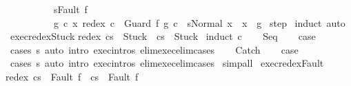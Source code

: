 \begin{isabellebody}
\ \ \ \ \ \ \ \ \ \ s{\isacharequal}Fault\ f\ {\isasymor}\ \isanewline
\ \ \ \ \ \ \ \ \ \ {\isacharparenleft}{\isasymexists}g\ c\ x{\isachardot}\ redex\ c\ {\isacharequal}\ Guard\ f\ g\ c\ {\isasymand}\ s{\isacharequal}Normal\ x\ {\isasymand}\ x\ {\isasymnotin}\ g{\isacharparenright}{\isachardoublequoteclose}\isanewline
%
\isadelimproof
%
\endisadelimproof
%
\isatagproof
{}\isamarkupfalse%
\ step\isanewline
{}\isamarkupfalse%
\ induct\ auto%
\endisatagproof
{\isafoldproof}%
%
\isadelimproof
\isanewline
%
\endisadelimproof
\isanewline
{}\isamarkupfalse%
\ exec{\isacharunderscore}redex{\isacharunderscore}Stuck{\isacharcolon}\isanewline
{\isachardoublequoteopen}{\isasymGamma}{\isasymturnstile}{\isasymlangle}redex\ c{\isacharcomma}s{\isasymrangle}\ {\isasymRightarrow}\ Stuck\ {\isasymLongrightarrow}\ {\isasymGamma}{\isasymturnstile}{\isasymlangle}c{\isacharcomma}s{\isasymrangle}\ {\isasymRightarrow}\ Stuck{\isachardoublequoteclose}\isanewline
%
\isadelimproof
%
\endisadelimproof
%
\isatagproof
{}\isamarkupfalse%
\ {\isacharparenleft}induct\ c{\isacharparenright}\isanewline
\ \ \isamarkupfalse%
\ Seq\isanewline
\ \ \isamarkupfalse%
\ {\isacharquery}case\isanewline
\ \ \ \ \isamarkupfalse%
\ {\isacharparenleft}cases\ s{\isacharparenright}\ {\isacharparenleft}auto\ intro{\isacharcolon}\ exec{\isachardot}intros\ elim{\isacharcolon}exec{\isacharunderscore}elim{\isacharunderscore}cases{\isacharparenright}\isanewline
{}\isamarkupfalse%
\isanewline
\ \ \isamarkupfalse%
\ Catch\isanewline
\ \ \isamarkupfalse%
\ {\isacharquery}case\isanewline
\ \ \ \ \isamarkupfalse%
\ {\isacharparenleft}cases\ s{\isacharparenright}\ {\isacharparenleft}auto\ intro{\isacharcolon}\ exec{\isachardot}intros\ elim{\isacharcolon}exec{\isacharunderscore}elim{\isacharunderscore}cases{\isacharparenright}\isanewline
{}\isamarkupfalse%
\ simp{\isacharunderscore}all%
\endisatagproof
{\isafoldproof}%
%
\isadelimproof
\isanewline
%
\endisadelimproof
\isanewline
{}\isamarkupfalse%
\ exec{\isacharunderscore}redex{\isacharunderscore}Fault{\isacharcolon}\isanewline
{\isachardoublequoteopen}{\isasymGamma}{\isasymturnstile}{\isasymlangle}redex\ c{\isacharcomma}s{\isasymrangle}\ {\isasymRightarrow}\ Fault\ f\ {\isasymLongrightarrow}\ {\isasymGamma}{\isasymturnstile}{\isasymlangle}c{\isacharcomma}s{\isasymrangle}\ {\isasymRightarrow}\ Fault\ f{\isachardoublequoteclose}\isanewline

\end{isabellebody}
